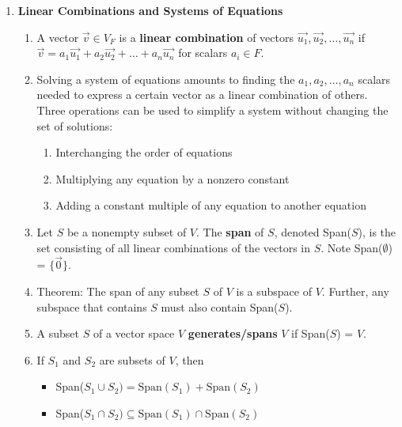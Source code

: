 \documentclass[10pt]{article}
\begin{document}
\begin{multicols*}{2}
\begin{enumerate}
    \item \textbf{Linear Combinations and Systems of Equations}
    \begin{enumerate}
        \item A vector $\vec{v} \in V_F$ is a \textbf{linear combination} of vectors $\vec{u_1}, \vec{u_2}, \hdots, \vec{u_n}$ if $\vec{v} = a_1\vec{u_1} + a_2\vec{u_2} + \hdots + a_n\vec{u_n}$ for scalars $a_i \in F$.
        \item Solving a system of equations amounts to finding the $a_1, a_2, \hdots, a_n$ scalars needed to express a certain vector as a linear combination of others. Three operations can be used to simplify a system without changing the set of solutions:
        \begin{enumerate}
            \item Interchanging the order of equations
            \item Multiplying any equation by a nonzero constant
            \item Adding a constant multiple of any equation to another equation
        \end{enumerate}
        \item Let $S$ be a nonempty subset of $V$. The \textbf{span} of $S$, denoted Span($S$), is the set consisting of all linear combinations of the vectors in $S$. Note Span($\emptyset$) = $\{ \vec{0} \}$.
        \item Theorem: The span of any subset $S$ of $V$ is a subspace of $V$. Further, any subspace that contains $S$ must also contain Span($S$).
        \item A subset $S$ of a vector space $V$ \textbf{generates/spans} $V$ if Span($S$) = $V$. 
        \item If $S_1$ and $S_2$ are subsets of $V$, then
        \begin{itemize}
            \item Span($S_1 \cup S_2) = \text{Span}(S_1) + \text{Span}(S_2)$
            \item Span($S_1 \cap S_2) \subseteq \text{Span}(S_1) \cap \text{Span}(S_2)$
        \end{itemize}
    \end{enumerate}
    

\end{enumerate}
\end{multicols*}
\end{document}
